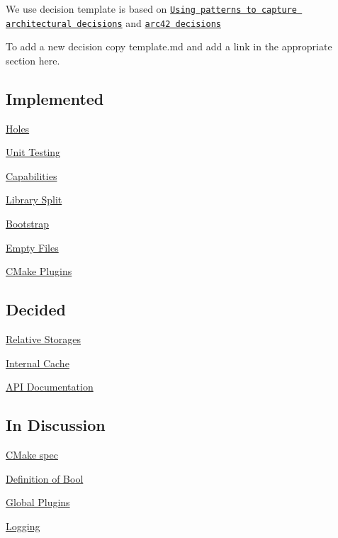 We use decision template is based on \href{http://www.cs.rug.nl/~paris/papers/IEEESW07.pdf}{\tt Using patterns to capture architectural decisions} and \href{http://confluence.arc42.org/display/templateEN/9.+Design+Decisions}{\tt arc42 decisions}

To add a new decision copy template.\+md and add a link in the appropriate section here.

\subsection*{Implemented}


\begin{DoxyItemize}
\item \hyperlink{doc_decisions_holes_md}{Holes}
\item \hyperlink{doc_decisions_unit_testing_md}{Unit Testing}
\item \hyperlink{doc_decisions_capabilities_md}{Capabilities}
\item \hyperlink{doc_decisions_library_split_md}{Library Split}
\item \hyperlink{doc_decisions_bootstrap_md}{Bootstrap}
\item \hyperlink{doc_decisions_empty_files_md}{Empty Files}
\item \hyperlink{doc_decisions_cmake_plugins_md}{C\+Make Plugins}
\end{DoxyItemize}

\subsection*{Decided}


\begin{DoxyItemize}
\item \hyperlink{doc_decisions_relative_md}{Relative Storages}
\item \hyperlink{doc_decisions_internal_cache_md}{Internal Cache}
\item \hyperlink{doc_decisions_api_documentation_md}{A\+P\+I Documentation}
\end{DoxyItemize}

\subsection*{In Discussion}


\begin{DoxyItemize}
\item \hyperlink{doc_decisions_cmake_spec_md}{C\+Make spec}
\item \hyperlink{doc_decisions_bool_md}{Definition of Bool}
\item \hyperlink{doc_decisions_global_plugins_md}{Global Plugins}
\item \hyperlink{doc_decisions_logging_md}{Logging}
\end{DoxyItemize}

